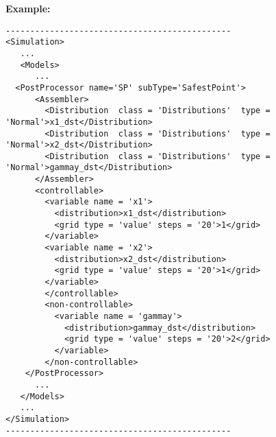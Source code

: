 \textbf{Example:}
\begin{lstlisting}[style=XML]
----------------------------------------------
<Simulation>
   ...
   <Models>
      ...
  <PostProcessor name='SP' subType='SafestPoint'>
      <Assembler>
        <Distribution  class = 'Distributions'  type = 'Normal'>x1_dst</Distribution>
        <Distribution  class = 'Distributions'  type = 'Normal'>x2_dst</Distribution>
        <Distribution  class = 'Distributions'  type = 'Normal'>gammay_dst</Distribution>
      </Assembler>
      <controllable>
        <variable name = 'x1'>
          <distribution>x1_dst</distribution>
          <grid type = 'value' steps = '20'>1</grid>   		
        </variable>
        <variable name = 'x2'>
          <distribution>x2_dst</distribution>
          <grid type = 'value' steps = '20'>1</grid>   		
        </variable>
        </controllable>
        <non-controllable>
          <variable name = 'gammay'>
            <distribution>gammay_dst</distribution>
            <grid type = 'value' steps = '20'>2</grid>
          </variable> 	
        </non-controllable>
    </PostProcessor>
      ...
   </Models>
   ...
</Simulation>
----------------------------------------------
\end{lstlisting}
